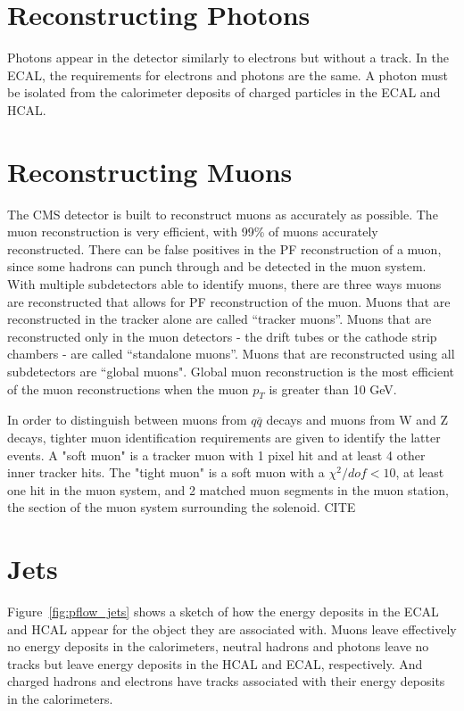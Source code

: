 \section{Reconstructing Photons}

Photons appear in the detector similarly to electrons but without a track. In the ECAL, the requirements for electrons and photons are the same. A photon must be isolated from the calorimeter deposits of charged particles in the ECAL and HCAL.

\section{Reconstructing Muons}

The CMS detector is built to reconstruct muons as accurately as possible. The muon reconstruction is very efficient, with 99\% of muons accurately reconstructed. There can be false positives in the PF reconstruction of a muon, since some hadrons can punch through and be detected in the muon system. With multiple subdetectors able to identify muons, there are three ways muons are reconstructed that allows for PF reconstruction of the muon. Muons that are reconstructed in the tracker alone are called “tracker muons”. Muons that are reconstructed only in the muon detectors - the drift tubes or the cathode strip chambers - are called “standalone muons”. Muons that are reconstructed using all subdetectors are “global muons". Global muon reconstruction is the most efficient of the muon reconstructions when the muon $p_T$ is greater than 10 GeV.

In order to distinguish between muons from $q\bar{q}$ decays and muons from W and Z decays, tighter muon identification requirements are given to identify the latter events. A "soft muon" is a tracker muon with 1 pixel hit and at least 4 other inner tracker hits. The "tight muon" is a soft muon with a $\chi^2/dof < 10$, at least one hit in the muon system, and 2 matched muon segments in the muon station, the section of the muon system surrounding the solenoid. CITE


\section{Jets}

Figure~\ref{fig:pflow_jets} shows a sketch of how the energy deposits in the ECAL and HCAL appear for the object they are associated with. Muons leave effectively no energy deposits in the calorimeters, neutral hadrons and photons leave no tracks but leave energy deposits in the HCAL and ECAL, respectively. And charged hadrons and electrons have tracks associated with their energy deposits in the calorimeters.


